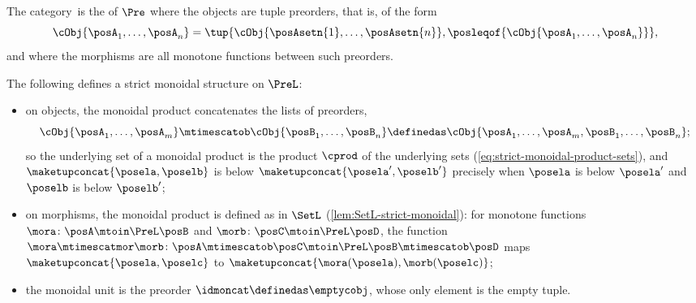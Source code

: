\begin{definition}
    \label{def:PreL}
    The category~\PreL is the  of $\Pre$ where the objects are tuple preorders, that is,  of the form
    \begin{equation}
        \cObj{\posA_1,\ldots, \posA_n} = \tup{\cObj{\posAsetn{1},\ldots, \posAsetn{n}}, \posleqof{\cObj{\posA_1,\ldots, \posA_n}}},
    \end{equation}
    and where the morphisms are all monotone functions between such preorders.
\end{definition}

\begin{lemma}\label{lem:PosL-associative-stacking}
    \label{lem:PreL-strict-monoidal}
    The following defines a strict monoidal structure on $\PreL$:
    \begin{itemize}
        \item on objects, the monoidal product concatenates the lists of preorders,
              \begin{equation}
                  \label{eq:multposstack}
                  \cObj{\posA_1,\ldots, \posA_m} \mtimescatob \cObj{\posB_1,\ldots, \posB_n} \definedas
                  \cObj{\posA_1,\ldots, \posA_m, \posB_1,\ldots, \posB_n};
              \end{equation}
              so the underlying set of a monoidal product is the product $\cprod$ of the underlying sets (\cref{eq:strict-monoidal-product-sets}), and $\maketupconcat{\posela, \poselb}$ is below $\maketupconcat{\posela', \poselb'}$ precisely when $\posela$ is below $\posela'$ and $\poselb$ is below $\poselb'$;
        \item on morphisms, the monoidal product is defined as in $\SetL$ (\cref{lem:SetL-strict-monoidal}): for monotone functions $\mora \colon \posA \mtoin\PreL \posB$ and $\morb \colon \posC \mtoin\PreL \posD$, the function $\mora \mtimescatmor \morb \colon \posA \mtimescatob \posC \mtoin\PreL \posB \mtimescatob \posD$ maps $\maketupconcat{\posela, \poselc}$ to $\maketupconcat{\mora(\posela), \morb(\poselc)}$;
        \item the monoidal unit is the preorder $\idmoncat \definedas \emptycobj$, whose only element is the empty tuple.
    \end{itemize}
\end{lemma}

